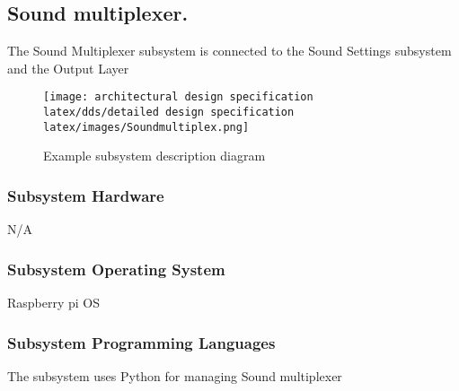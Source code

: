 \subsection{Sound multiplexer.}
The Sound Multiplexer subsystem is connected to the Sound Settings subsystem and the Output Layer

\begin{figure}[h!]
	\centering
 	\texttt{[image: architectural design specification latex/dds/detailed design specification latex/images/Soundmultiplex.png]}
 \caption{Example subsystem description diagram}
\end{figure}

\subsubsection{Subsystem Hardware}
N/A

\subsubsection{Subsystem Operating System}
Raspberry pi OS

 \subsubsection{Subsystem Programming Languages}
 The subsystem uses Python for managing Sound multiplexer
